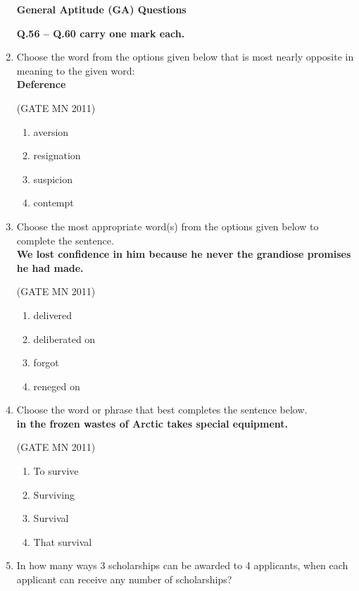 \documentclass[journal]{IEEEtran}
\begin{document}
\begin{enumerate}
\textbf{General Aptitude (GA) Questions}

\noindent
\textbf{Q.56 -- Q.60 carry one mark each.}



\item Choose the word from the options given below that is most nearly opposite in meaning to the given word: \\
\textbf{Deference}

\hfill(GATE MN 2011)

\begin{enumerate}
\item aversion  
\item resignation  
\item suspicion  
\item contempt  
\end{enumerate}


\item Choose the most appropriate word(s) from the options given below to complete the sentence. \\
\textbf{We lost confidence in him because he never \underline{\hspace{2cm}} the grandiose promises he had made.}


\hfill(GATE MN 2011)
\begin{enumerate}
\item delivered  
\item deliberated on  
\item forgot  
\item reneged on  
\end{enumerate}

\item Choose the word or phrase that best completes the sentence below. \\
\textbf{\underline{\hspace{2cm}} in the frozen wastes of Arctic takes special equipment.}


\hfill(GATE MN 2011)
\begin{enumerate}
\item To survive  
\item Surviving  
\item Survival  
\item That survival  
\end{enumerate}

\item In how many ways 3 scholarships can be awarded to 4 applicants, when each applicant can receive any number of scholarships?



\end{enumerate}
\end{document}
